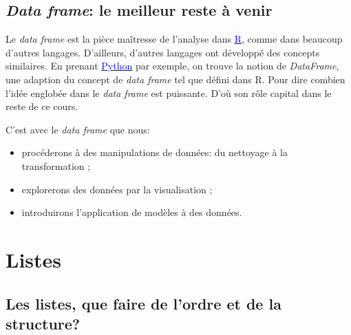 \documentclass[]{book}
\begin{document}
\normalsize

\subsection{\texorpdfstring{\emph{Data frame}: le meilleur reste à
venir}{Data frame: le meilleur reste à venir}}\label{data-frame-le-meilleur-reste-a-venir}

Le \emph{data frame} est la pièce maîtresse de l'analyse dans
\href{http://r-project.org}{\textcolor{blue}{R}}, comme dans beaucoup
d'autres langages. D'ailleurs, d'autres langages ont développé des
concepts similaires. En prenant
\href{https://www.python.org/}{\textcolor{blue}{Python}} par exemple, on
trouve la notion de \emph{DataFrame}, une adaption du concept de
\emph{data frame} tel que défini dans R. Pour dire combien l'idée
englobée dans le \emph{data frame} est puissante. D'où son rôle capital
dans le reste de ce cours.

C'est avec le \emph{data frame} que nous:

\begin{itemize}
\item
  procéderons à des manipulations de données: du nettoyage à la
  transformation ;
\item
  explorerons des données par la visualisation ;
\item
  introduirons l'application de modèles à des données.
\end{itemize}

\section{Listes}\label{listes}

\subsection{Les listes, que faire de l'ordre et de la
structure?}\label{les-listes-que-faire-de-lordre-et-de-la-structure}

\tiny
\end{document}

